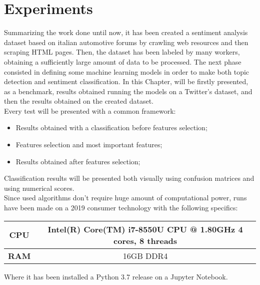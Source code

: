 
\chapter{Experiments}

Summarizing the work done until now, it has been created a sentiment analysis dataset based on italian automotive forums by crawling web resources and then scraping HTML pages. Then, the dataset has been labeled by many workers, obtaining a sufficiently large amount of data to be processed. The next phase consisted in defining some machine learning models in order to make both topic detection and sentiment classification. In this Chapter, will be firstly presented, as a benchmark, results obtained running the models on a Twitter's dataset, and then the results obtained on the created dataset.\\
Every test will be presented with a common framework: 
\begin{itemize}
	\item Results obtained with a classification before features selection;
	\item Features selection and most important features;
	\item Results obtained after features selection;
\end{itemize}
Classification results will be presented both visually using confusion matrices and using numerical scores.\\
Since used algorithms don't require huge amount of computational power, runs have been made on a 2019 consumer technology with the following specifics:
\begin{center}
	\begin{tabular}{ |c||c| } 
		\hline
		\textbf{CPU} & Intel(R) Core(TM) i7-8550U CPU @ 1.80GHz 4 cores, 8 threads\\ 
		\hline
		\textbf{RAM} & 16GB DDR4 \\
		\hline
	\end{tabular}
\end{center}
Where it has been installed a Python 3.7 release on a Jupyter Notebook.


